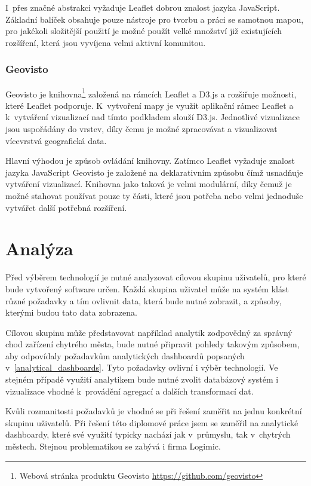 I~přes značné abstrakci vyžaduje Leaflet dobrou znalost jazyka JavaScript. Základní balíček obsahuje pouze nástroje pro tvorbu a práci se samotnou mapou, pro jakékoli složitější použití je možné použít velké množství již existujících rozšíření, která jsou vyvíjena velmi aktivní komunitou.
\subsection*{Geovisto}
Geovisto je knihovna\footnote{Webová stránka produktu Geovisto \url{https://github.com/geovisto}} založená na rámcích Leaflet a D3.js a rozšiřuje možnosti, které Leaflet podporuje. K~vytvoření mapy je využit aplikační rámec Leaflet a k~vytváření vizualizací nad tímto podkladem slouží D3.js. Jednotlivé vizualizace jsou uspořádány do vrstev, díky čemu je možné zpracovávat a vizualizovat vícevrstvá geografická data.

Hlavní výhodou je způsob ovládání knihovny. Zatímco Leaflet vyžaduje znalost jazyka JavaScript Geovisto je založené na deklarativním způsobu čímž usnadňuje vytváření vizualizací. Knihovna jako taková je velmi modulární, díky čemuž je možné stahovat používat pouze ty části, které jsou potřeba nebo velmi jednoduše vytvářet další potřebná rozšíření.

\chapter{Analýza}
\label{chapter_analysis}
Před výběrem technologií je nutné analyzovat cílovou skupinu uživatelů, pro které bude vytvořený software určen. Každá skupina uživatel může na systém klást různé požadavky a tím ovlivnit data, která bude nutné zobrazit, a způsoby, kterými budou tato data zobrazena.

Cílovou skupinu může představovat například analytik zodpovědný za správný chod zařízení chytrého města, bude nutné připravit pohledy takovým způsobem, aby odpovídaly požadavkům analytických dashboardů popsaných v~\ref{analytical_dashboards}. Tyto požadavky ovlivní i výběr technologií. Ve stejném případě využití analytikem bude nutné zvolit databázový systém i vizualizace vhodné k~provádění agregací a dalších transformací dat.

Kvůli rozmanitosti požadavků je vhodné se při řešení zaměřit na jednu konkrétní skupinu uživatelů. Při řešení této diplomové práce jsem se zaměřil na analytické dashboardy, které své využití typicky nachází jak v~průmyslu, tak v~chytrých městech. Stejnou problematikou se zabývá i firma Logimic.

